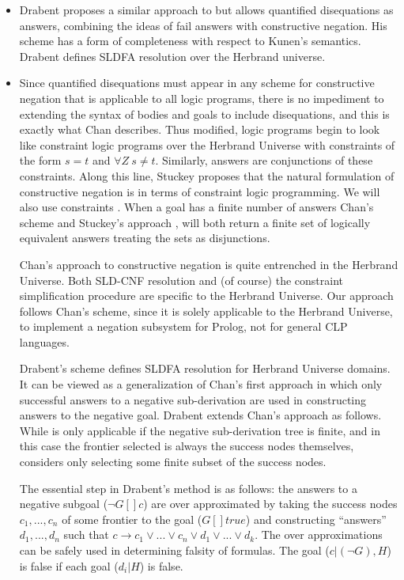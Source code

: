 \documentclass{tlp}
\newcommand{\where}{[\!]} %
\begin{document}
\begin{itemize}
\item Drabent \cite{Drabent} proposes a similar approach to
\cite{Malus} but allows quantified disequations as answers, combining
the ideas of fail answers with constructive negation. His scheme has a
form of completeness with respect to Kunen's semantics. Drabent
defines SLDFA resolution over the Herbrand universe.

\item Since quantified disequations must appear in any scheme for
constructive negation that is applicable to all logic programs, there
is no impediment to extending the syntax of bodies and goals to
include disequations, and this is exactly what Chan describes. Thus
modified, logic programs begin to look like constraint logic programs
over the Herbrand Universe with constraints of the form $s=t$ and
$\forall Z~ s \neq t$. Similarly, answers are conjunctions of these
constraints. Along this line, Stuckey \cite{Stuckey95} proposes that
the natural formulation of constructive negation is in terms of
constraint logic programming. We will also use constraints%
. When a goal has a finite
number of answers Chan's scheme \cite{Chan1} and Stuckey's approach
\cite{Stuckey}, will both return a finite set of logically equivalent
answers treating the sets as disjunctions.

Chan's approach to constructive negation is quite entrenched in the
Herbrand Universe. Both SLD-CNF resolution and (of course) the
constraint simplification procedure are specific to the Herbrand
Universe. Our approach follows Chan's scheme, since it is solely
applicable to the Herbrand Universe, to implement a negation subsystem
for Prolog, not for general CLP languages.

Drabent's scheme \cite{Drabent} defines SLDFA resolution for Herbrand
Universe domains. It can be viewed as a generalization of Chan's first
approach \cite{Chan1} in which only successful answers to a negative
sub-derivation are used in constructing answers to the negative
goal. Drabent extends Chan's approach as follows. While
\cite{Chan1} is only applicable if the negative sub-derivation tree is
finite, and in this case the frontier selected is always the success
nodes themselves, \cite{Drabent} considers only selecting some finite
subset of the success nodes.

The essential step in Drabent's method is as follows: the answers to a
negative subgoal ($\neg G \where c$) are over approximated by taking
the success nodes $c_1, ..., c_n$ of some frontier to the goal ($G
\where true$) and constructing ``answers'' $d_1, ..., d_n$ such that
$c \rightarrow c_1 \vee ... \vee c_n \vee d_1 \vee ... \vee d_k$. The
over approximations can be safely used in determining falsity of
formulas. The goal ($c | (\neg G), H$) is false if each goal ($d_i |
H$) is false.


\end{itemize}
\end{document}
